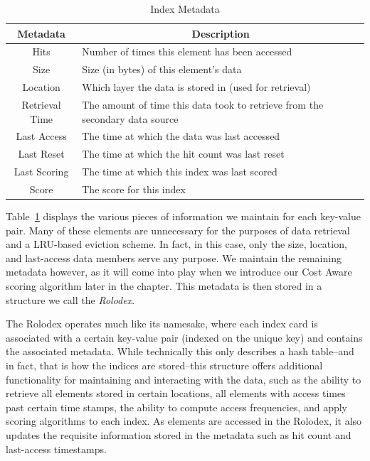 \begin{table}[htp]
  \begin{center}
    \begin{tabular}{|c|l|}
      \hline
      \multicolumn{1}{|c}{\textbf{Metadata}} &
      \multicolumn{1}{|c|}{\textbf{Description}}\\
      \hline
					Hits & Number of times this element has been accessed\\
					Size & Size (in bytes) of this element's data\\
		  Location & Which layer the data is stored in (used for retrieval)\\
Retrieval Time & The amount of time this data took to retrieve from the
			secondary data source\\
	 Last Access & The time at which the data was last accessed\\
		Last Reset & The time at which the hit count was last reset\\
	Last Scoring & The time at which this index was last scored\\
				 Score & The score for this index\\
      \hline
    \end{tabular}
    \caption{Index Metadata}
    \label{tab:metadata}
  \end{center}
\end{table}

Table~\ref{tab:metadata} displays the various pieces of information we maintain
for each key-value pair. Many of these elements are unnecessary for the
purposes of data retrieval and a LRU-based eviction scheme. In fact, in this
case, only the size, location, and last-access data members serve any purpose.
We maintain the remaining metadata however, as it will come into play when we
introduce our Cost Aware scoring algorithm later in the chapter. This metadata
is then stored in a structure we call the \emph{Rolodex}.

The Rolodex operates much like its namesake, where each index card is
associated with a certain key-value pair (indexed on the unique key) and
contains the associated metadata. While technically this only describes a hash
table--and in fact, that is how the indices are stored--this structure offers
additional functionality for maintaining and interacting with the data, such as
the ability to retrieve all elements stored in certain locations, all elements
with access times past certain time stamps, the ability to compute access
frequencies, and apply scoring algorithms to each index. As elements are
accessed in the Rolodex, it also updates the requisite information stored in
the metadata such as hit count and last-access timestamps.


